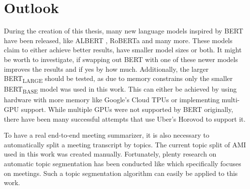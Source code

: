 \chapter{Outlook}\label{ch:outlook}

During the creation of this thesis, many new language models inspired by BERT have been released, like ALBERT \cite{1909.11942}, RoBERTa \cite{1907.11692} and many more.
These models claim to either achieve better results, have smaller model sizes or both.
It might be worth to investigate, if swapping out BERT with one of these newer models improves the results and if yes by how much.
Additionally, the larger BERT\textsubscript{LARGE} should be tested, as due to memory constrains only the smaller BERT\textsubscript{BASE} model was used in this work.
This can either be achieved by using hardware with more memory like Google's Cloud TPUs or implementing multi-GPU support.
While multiple GPUs were not supported by BERT originally, there have been many successful attempts that use Uber's Horovod \cite{sergeev2018horovod} to support it.

To have a real end-to-end meeting summarizer, it is also necessary to automatically split a meeting transcript by topics.
The current topic split of AMI used in this work was created manually.
Fortunately, plenty research on automatic topic segmentation has been conducted like \cite{10.3115/1075096.1075167} which specifically focuses on meetings.
Such a topic segmentation algorithm can easily be applied to this work.